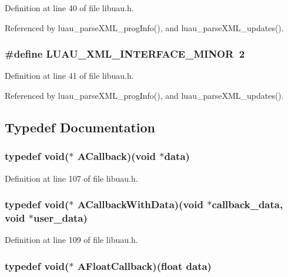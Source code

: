 Definition at line 40 of file libuau.h.

Referenced by luau\_\-parse\-XML\_\-prog\-Info(), and luau\_\-parse\-XML\_\-updates().
\subsubsection{\setlength{\rightskip}{0pt plus 5cm}\#define LUAU\_\-XML\_\-INTERFACE\_\-MINOR\ 2}\label{libuau_8h_a4}




Definition at line 41 of file libuau.h.

Referenced by luau\_\-parse\-XML\_\-prog\-Info(), and luau\_\-parse\-XML\_\-updates().

\subsection{Typedef Documentation}
\subsubsection{\setlength{\rightskip}{0pt plus 5cm}typedef void($\ast$ {\bf ACallback})(void $\ast$data)}\label{libuau_8h_a19}




Definition at line 107 of file libuau.h.
\subsubsection{\setlength{\rightskip}{0pt plus 5cm}typedef void($\ast$ {\bf ACallback\-With\-Data})(void $\ast$callback\_\-data, void $\ast$user\_\-data)}\label{libuau_8h_a21}




Definition at line 109 of file libuau.h.
\subsubsection{\setlength{\rightskip}{0pt plus 5cm}typedef void($\ast$ {\bf AFloat\-Callback})(float data)}\label{libuau_8h_a20}




